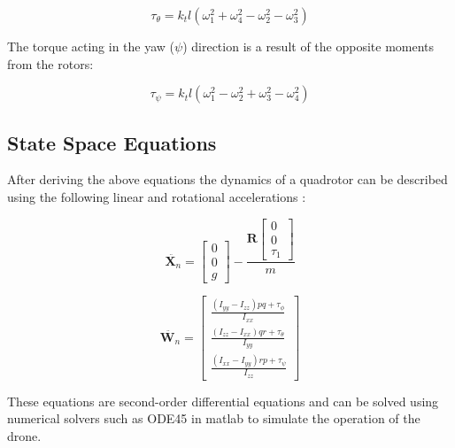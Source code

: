 \documentclass{UoNMCHA}
\numberwithin{equation}{section}
\begin{document}
\begin{equation}
\tau_{\theta} = k_t l (\omega_1^2 + \omega_4^2 - \omega_2^2 - \omega_3^2)
\end{equation}

The torque acting in the yaw (\(\psi\)) direction is a result of the opposite moments from the rotors:

\begin{equation}
\tau_{\psi} = k_t l (\omega_1^2 - \omega_2^2 + \omega_3^2 - \omega_4^2)
\end{equation}

\subsection{State Space Equations}

After deriving the above equations the dynamics of a quadrotor can be described using the following linear and rotational accelerations \cite{website:AndrewGibian} \cite{website:Quadrotorsystemmodeling} \cite{HindawiDynamcis}:

\begin{equation}
\ddot{\mathbf{X}_n} = \begin{bmatrix} 0 \\ 0 \\ g \end{bmatrix} - \frac{\mathbf{R} \begin{bmatrix} 0 \\ 0 \\ \tau_1 \end{bmatrix}}{m}
\end{equation}

\begin{equation}
\ddot{\mathbf{W}_n} = \begin{bmatrix}
    \frac{(I_{yy} - I_{zz}) pq + \tau_\phi}{I_{xx}} \\
    \frac{(I_{zz} - I_{xx}) qr + \tau_\theta}{I_{yy}} \\
    \frac{(I_{xx} - I_{yy}) rp + \tau_\psi}{I_{zz}}
\end{bmatrix}
\end{equation}

These equations are second-order differential equations and can be solved using numerical solvers such as ODE45 in matlab \cite{website:NMPCSIM} to simulate the operation of the drone.
\end{document}
